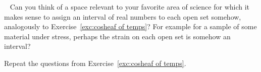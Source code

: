 \documentclass[CT4S-EN-RU]{subfiles}
\begin{document}
\begin{exerciseRUS}\label{exc:cosheaf of temps}
\end{exerciseRUS}

\begin{exerciseENG}~
\sexc Can you think of a space relevant to your favorite area of science for which it makes sense to assign an interval of real numbers to each open set somehow, analogously to Exercise~\ref{exc:cosheaf of temps}? For example for a sample of some material under stress, perhaps the strain on each open set is somehow an interval? 
\item Repeat the questions from Exercise~\ref{exc:cosheaf of temps}.
\endsexc
\end{exerciseENG}

\begin{exerciseRUS}~
\end{exerciseRUS}
\end{document}
